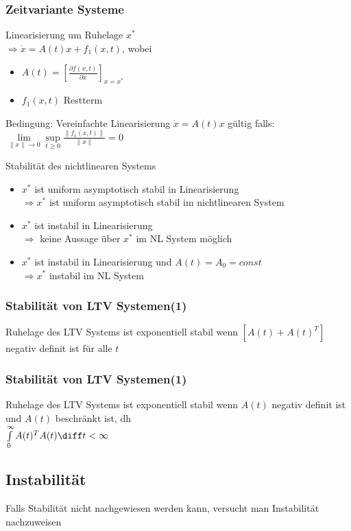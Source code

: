 \documentclass[german]{latex4ei/latex4ei_sheet}
\begin{document}
\subsubsection*{Zeitvariante Systeme}
Linearisierung um Ruhelage $x^*$ \\
$\Rightarrow \dot{x} = A(t) x + f_1(x,t)$, wobei \\
\begin{itemize}
  \item $A(t) = \left[ \frac{\partial f(x,t)}{\partial x} \right]_{x=x^*}$
  \item $f_1(x,t)$ Restterm
\end{itemize}

Bedingung: Vereinfachte Linearisierung $\dot{x}  = A(t) x$ gültig falls: \\
$\lim\limits_{\|x\| \rightarrow 0} \sup\limits_{t \geq 0} \frac{\|f_1(x,t)\|}{\|x\|} = 0$

Stabilität des nichtlinearen Systems
\begin{itemize}
  \item $x^*$ ist uniform asymptotisch stabil in Linearisierung \\
    $\Rightarrow x^*$ ist uniform asymptotisch stabil im nichtlinearen System
  \item $x^*$ ist instabil in Linearisierung \\
    $\Rightarrow$ keine Aussage über $x^*$ im NL System möglich
  \item $x^*$ ist instabil in Linearisierung und $A(t) = A_0 = const$ \\
    $\Rightarrow x^*$ instabil im NL System
\end{itemize}

\subsubsection*{Stabilität von LTV Systemen(1)}
Ruhelage des LTV Systems ist exponentiell stabil wenn $\left[ A(t) + A(t)^T \right]$ negativ definit ist für alle $t$

\subsubsection*{Stabilität von LTV Systemen(1)}
Ruhelage des LTV Systems ist exponentiell stabil wenn $A(t)$ negativ definit ist und $A(t)$ beschränkt ist, dh \\
$\int\limits_{0}^{\infty}A(t)^T A(t) \diff t < \infty$

\subsection{Instabilität}
Falls Stabilität nicht nachgewiesen werden kann, versucht man Instabilität nachzuweisen
\end{document}
